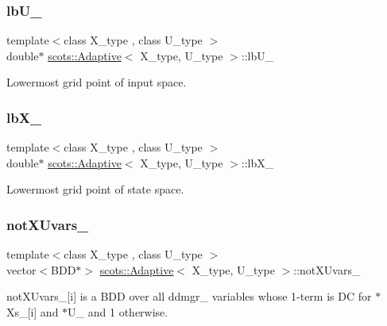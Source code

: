 \subsubsection{\texorpdfstring{lb\+U\+\_\+}{lbU\_}}
{\footnotesize\ttfamily template$<$class X\+\_\+type , class U\+\_\+type $>$ \\
double$\ast$ \hyperlink{classscots_1_1Adaptive}{scots\+::\+Adaptive}$<$ X\+\_\+type, U\+\_\+type $>$\+::lb\+U\+\_\+}

Lowermost grid point of input space. \mbox{\label{classscots_1_1Adaptive_a6018fcd45bd81cc0073f0bd1f375829d}} 
\subsubsection{\texorpdfstring{lb\+X\+\_\+}{lbX\_}}
{\footnotesize\ttfamily template$<$class X\+\_\+type , class U\+\_\+type $>$ \\
double$\ast$ \hyperlink{classscots_1_1Adaptive}{scots\+::\+Adaptive}$<$ X\+\_\+type, U\+\_\+type $>$\+::lb\+X\+\_\+}

Lowermost grid point of state space. \mbox{\label{classscots_1_1Adaptive_ac3f203003011bcea5176ef294ab7a8a0}} 
\subsubsection{\texorpdfstring{not\+X\+Uvars\+\_\+}{notXUvars\_}}
{\footnotesize\ttfamily template$<$class X\+\_\+type , class U\+\_\+type $>$ \\
vector$<$B\+DD$\ast$$>$ \hyperlink{classscots_1_1Adaptive}{scots\+::\+Adaptive}$<$ X\+\_\+type, U\+\_\+type $>$\+::not\+X\+Uvars\+\_\+}

not\+X\+Uvars\+\_\+\mbox{[}i\mbox{]} is a B\+DD over all ddmgr\+\_\+ variables whose 1-\/term is DC for $\ast$\+Xs\+\_\+\mbox{[}i\mbox{]} and $\ast$\+U\+\_\+ and 1 otherwise. \mbox{\label{classscots_1_1Adaptive_a8fbbf6976e589506c9e4c38045196c07}} 

